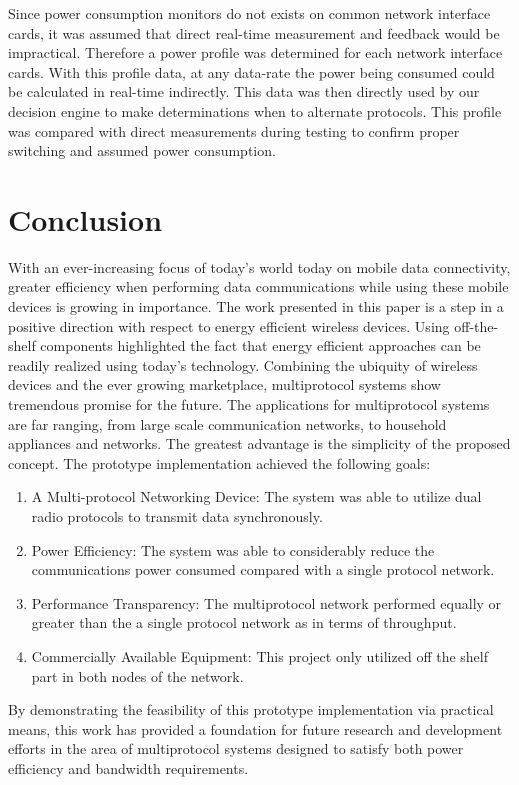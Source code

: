 \documentclass[conference]{IEEEtran}
\begin{document}
Since power consumption monitors do not exists on common network
interface cards, it was assumed that direct real-time measurement
and feedback would be impractical.  Therefore a power profile was
determined for each network interface cards.  With this profile
data, at any data-rate the power being consumed could be calculated
in real-time indirectly.  This data was then directly used by our
decision engine to make determinations when to alternate protocols.
This profile was compared with direct measurements during testing to
confirm proper switching and assumed power consumption.


\section{Conclusion}
With an ever-increasing focus of today's world today on mobile data
connectivity, greater efficiency when performing data communications
while using these mobile devices is growing in importance.  The work
presented in this paper is a step in a positive direction with
respect to energy efficient wireless devices. Using off-the-shelf
components highlighted the fact that energy efficient approaches can
be readily realized using today's technology.  Combining the
ubiquity of wireless devices and the ever growing marketplace,
multiprotocol systems show tremendous promise for the future. The
applications for multiprotocol systems are far ranging, from large
scale communication networks, to household appliances and networks.
The greatest advantage is the simplicity of the proposed concept.
The prototype implementation achieved the following goals:
\begin{enumerate}
  \item A Multi-protocol Networking Device:  The system was able to utilize dual radio protocols to transmit data
  synchronously.
  \item Power Efficiency:  The system was able to considerably reduce the communications power consumed compared with a single protocol
  network.
  \item Performance Transparency:  The multiprotocol network performed equally or greater than the a single protocol network as  in terms of
  throughput.
  \item Commercially Available Equipment: This project only utilized off the shelf part in both nodes of the
  network.
\end{enumerate}

By demonstrating the feasibility of this prototype implementation
via practical means, this work has provided a foundation for future
research and development efforts in the area of multiprotocol
systems designed to satisfy both power efficiency and bandwidth
requirements.



\end{document}

